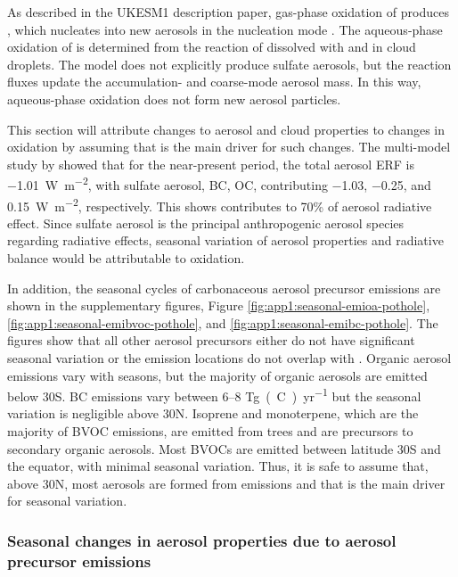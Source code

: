 As described in the UKESM1 description paper, gas-phase oxidation of  produces , which nucleates into new aerosols in the nucleation mode \citep{mulcahyDescriptionEvaluationAerosol2020}. The aqueous-phase oxidation of  is determined from the reaction of dissolved  with  and  in cloud droplets. The model does not explicitly produce sulfate aerosols, but the reaction fluxes update the accumulation- and coarse-mode aerosol mass. In this way, aqueous-phase oxidation does not form new aerosol particles.

This section will attribute changes to aerosol and cloud properties to changes in  oxidation by assuming that  is the main driver for such changes. The multi-model study by \citet{thornhillEffectiveRadiativeForcing2021} showed that for the near-present period, the total aerosol ERF is \qty{-1.01}{W~m^{-2}}, with sulfate aerosol, BC, OC, contributing \num[]{-1.03}, \num[]{-0.25}, and \qty{0.15}{W~m^{-2}}, respectively. This shows  contributes to 70\% of aerosol radiative effect. Since sulfate aerosol is the principal anthropogenic aerosol species regarding radiative effects, seasonal variation of aerosol properties and radiative balance would be attributable to  oxidation. 

In addition, the seasonal cycles of carbonaceous aerosol precursor emissions are shown in the supplementary figures, Figure \ref{fig:app1:seasonal-emioa-pothole}, \ref{fig:app1:seasonal-emibvoc-pothole}, and \ref{fig:app1:seasonal-emibc-pothole}. The figures show that all other aerosol precursors either do not have significant seasonal variation or the emission locations do not overlap with . Organic aerosol emissions vary with seasons, but the majority of organic aerosols are emitted below 30\textdegree S. BC emissions vary between 6--8 \unit{Tg(C)~yr^{-1}} but the seasonal variation is negligible above 30\textdegree N.  Isoprene and monoterpene, which are the majority of BVOC emissions, are emitted from trees and are precursors to secondary organic aerosols. Most BVOCs are emitted between latitude 30\textdegree S and the equator, with minimal seasonal variation. Thus, it is safe to assume that, above 30\textdegree N, most aerosols are formed from  emissions and that  is the main driver for seasonal variation.


\subsubsection{Seasonal changes in aerosol properties due to aerosol precursor emissions}

